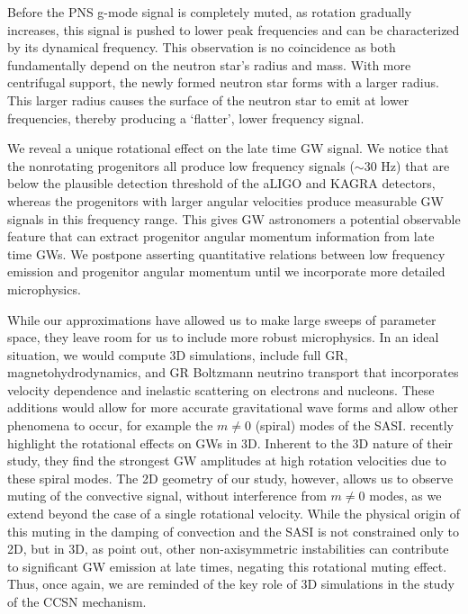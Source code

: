 \documentclass[twocolumn,times]{aastex62}  %
\begin{document}
Before the PNS g-mode signal is completely muted, as rotation gradually increases, this signal is pushed to lower peak frequencies and can be characterized by its dynamical frequency.  This observation is no coincidence as both  fundamentally depend on the neutron star's radius and mass.  With more centrifugal support, the newly formed neutron star forms with a larger radius.  This larger radius causes the surface of the neutron star to emit at lower frequencies, thereby producing a `flatter', lower frequency signal.

We reveal a unique rotational effect on the late time GW signal.  We notice that the nonrotating progenitors all produce low frequency signals ($\sim 30$ Hz) that are below the plausible detection threshold of the aLIGO and KAGRA detectors, whereas the progenitors with larger angular velocities produce measurable GW signals in this frequency range.  
This gives GW astronomers a potential observable feature that can extract progenitor angular momentum information from late time GWs.  We postpone asserting quantitative relations between low frequency emission and progenitor angular momentum until we incorporate more detailed microphysics.


While our approximations have allowed us to make large sweeps of parameter space, they leave room for us to include more robust microphysics.  In an ideal situation, we would compute 3D simulations, include full GR, magnetohydrodynamics, and GR Boltzmann neutrino transport that incorporates velocity dependence and inelastic scattering on electrons and nucleons.  These additions would allow for more accurate gravitational wave forms and allow other phenomena to occur, for example the $m\ne 0$ (spiral) modes of the SASI. \citet{andresen:2018} recently highlight the rotational effects on GWs in 3D.  Inherent to the 3D nature of their study, they find the strongest GW amplitudes at high rotation velocities due to these spiral modes.  The 2D geometry of our study, however, allows us to observe muting of the convective signal, without interference from $m\ne 0$ modes, as we extend beyond the case of a single rotational velocity.
While the physical origin of this muting in the damping of convection and the SASI is not constrained only to 2D, but in 3D, as \citet{andresen:2018} point out, other non-axisymmetric instabilities can contribute to significant GW emission at late times, negating this rotational muting effect.
Thus, once again, we are reminded of the key role of 3D simulations in the study of the CCSN mechanism.
\end{document}
